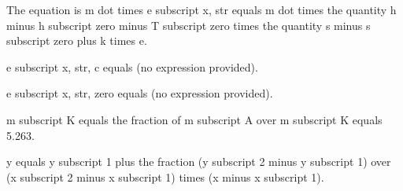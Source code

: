 The equation is m dot times e subscript x, str equals m dot times the quantity h minus h subscript zero minus T subscript zero times the quantity s minus s subscript zero plus k times e.

e subscript x, str, c equals (no expression provided).

e subscript x, str, zero equals (no expression provided).

m subscript K equals the fraction of m subscript A over m subscript K equals 5.263.

y equals y subscript 1 plus the fraction (y subscript 2 minus y subscript 1) over (x subscript 2 minus x subscript 1) times (x minus x subscript 1).